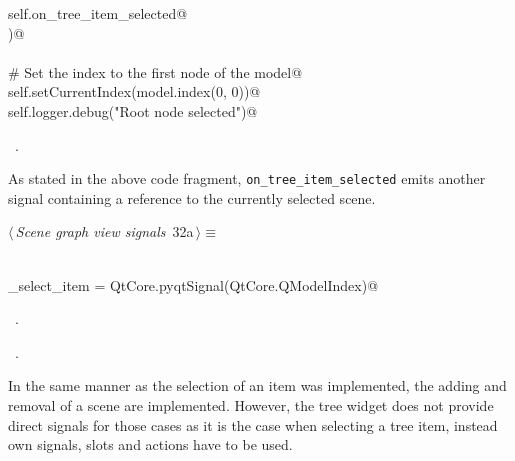 \documentclass[
    a4paper,      %
    10pt,         %
    openright,    %
    notitlepage,  %
    parskip=half, %
]{scrreprt}       %
\theoremstyle{definition}                    %
\begin{document}
\begin{flushleft}
\begin{minipage}{\linewidth}
\begin{list}{}{}
\mbox{}\lstinline@        self.on_tree_item_selected@\\
\mbox{}\lstinline@    )@\\
\mbox{}\lstinline@@\\
\mbox{}\lstinline@    # Set the index to the first node of the model@\\
\mbox{}\lstinline@    self.setCurrentIndex(model.index(0, 0))@\\
\mbox{}\lstinline@    self.logger.debug("Root node selected")@{\NWsep}
\end{list}
\vspace{-1.5ex}
\footnotesize
\begin{list}{}{\setlength{\itemsep}{-\parsep}\setlength{\itemindent}{-\leftmargin}}
\item \NWtxtMacroRefIn\ .

\item{}
\end{list}
\end{minipage}\vspace{4ex}
\end{flushleft}
As stated in the above code fragment, \verb+on_tree_item_selected+ emits another
signal containing a reference to the currently selected scene.

\begin{flushleft} \small
\begin{minipage}{\linewidth}\label{scrap36}\raggedright\small
{} $\langle\,${\itshape Scene graph view signals}\nobreak\ {\footnotesize {32a}}$\,\rangle\equiv$
\vspace{-1ex}
\begin{list}{}{} \item
\mbox{}\lstinline@@\\
\mbox{}\lstinline@do_select_item = QtCore.pyqtSignal(QtCore.QModelIndex)@\\
\mbox{}\lstinline@@{\NWsep}
\end{list}
\vspace{-1.5ex}
\footnotesize
\begin{list}{}{\setlength{\itemsep}{-\parsep}\setlength{\itemindent}{-\leftmargin}}
\item \NWtxtMacroDefBy\ .
\item \NWtxtMacroRefIn\ .

\item{}
\end{list}
\end{minipage}\vspace{4ex}
\end{flushleft}
In the same manner as the selection of an item was implemented, the adding and
removal of a scene are implemented. However, the tree widget does not provide
direct signals for those cases as it is the case when selecting a tree item,
instead own signals, slots and actions have to be used.
\end{document}
